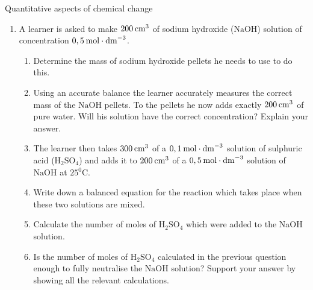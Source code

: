 \begin{eocexercises}{Quantitative aspects of chemical change}
\begin{enumerate}[noitemsep, label=\textbf{\arabic*}. ]
\label{m38712*id286663}\begin{enumerate}[noitemsep, label=\textbf{\alph*}. ] 
            \label{m38712*uid148}\item Write down a balanced equation for the reaction which takes place when these two solutions are mixed.
\label{m38712*uid149}\item Calculate the number of moles of sulphuric acid which were added to the sodium hydroxide solution.
\label{m38712*uid150}\item Is the number of moles of sulphuric acid enough to fully neutralise the sodium hydroxide solution? Support your answer by showing all relevant calculations.
(IEB Paper 2 2004)
\end{enumerate}
                \label{m38712*uid155}\item A learner is asked to make $200\phantom{\rule{2pt}{0ex}}{\mathrm{cm}}^{3}$ of sodium hydroxide ($\mathrm{NaOH}$) solution of concentration $0,5\phantom{\rule{2pt}{0ex}}\mathrm{mol}\ensuremath{\cdot}{\mathrm{dm}}^{-3}$.
\label{m38712*id286969}\begin{enumerate}[noitemsep, label=\textbf{\alph*}. ] 
            \label{m38712*uid156}\item Determine the mass of sodium hydroxide pellets he needs to use to do this.
\label{m38712*uid157}\item Using an accurate balance the learner accurately measures the correct mass of the $\mathrm{NaOH}$ pellets. To the pellets he now adds exactly $200\phantom{\rule{2pt}{0ex}}{\mathrm{cm}}^{3}$ of pure water. Will his solution have the correct concentration? Explain your answer.\item The learner then takes $300\phantom{\rule{2pt}{0ex}}{\mathrm{cm}}^{3}$ of a $0,1\phantom{\rule{2pt}{0ex}}\mathrm{mol}\ensuremath{\cdot}{\mathrm{dm}}^{-3}$ solution of sulphuric acid ($\mathrm{H}{}_{2}\mathrm{SO}{}_{4}$) and adds it to $200\phantom{\rule{2pt}{0ex}}{\mathrm{cm}}^{3}$ of a $0,5\phantom{\rule{2pt}{0ex}}\mathrm{mol}\ensuremath{\cdot}{\mathrm{dm}}^{-3}$ solution of $\mathrm{NaOH}$ at $25{}^{0}\mathrm{C}$.
\label{m38712*uid158}\item Write down a balanced equation for the reaction which takes place when these two solutions are mixed.
\label{m38712*uid159}\item Calculate the number of moles of $\mathrm{H}{}_{2}\mathrm{SO}{}_{4}$ which were added to the NaOH solution.
\label{m38712*uid160}\item Is the number of moles of $\mathrm{H}{}_{2}\mathrm{SO}{}_{4}$ calculated in the previous question enough to fully neutralise the $\mathrm{NaOH}$ solution? Support your answer by showing all the relevant calculations.

\end{enumerate}
\end{enumerate}
\end{eocexercises}
